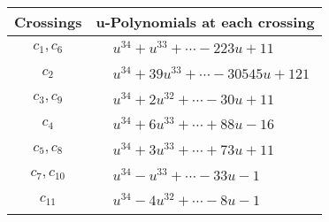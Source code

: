 \documentclass[1p]{elsarticle_modified}
\theoremstyle{definition}
\begin{document}
\begin{tabular}{m{50pt}|m{274pt}}
Crossings & \hspace{64pt}u-Polynomials at each crossing \\
\hline $$\begin{aligned}c_{1},c_{6}\end{aligned}$$&$\begin{aligned}
&u^{34}+u^{33}+\cdots-223 u+11
\end{aligned}$\\
\hline $$\begin{aligned}c_{2}\end{aligned}$$&$\begin{aligned}
&u^{34}+39 u^{33}+\cdots-30545 u+121
\end{aligned}$\\
\hline $$\begin{aligned}c_{3},c_{9}\end{aligned}$$&$\begin{aligned}
&u^{34}+2 u^{32}+\cdots-30 u+11
\end{aligned}$\\
\hline $$\begin{aligned}c_{4}\end{aligned}$$&$\begin{aligned}
&u^{34}+6 u^{33}+\cdots+88 u-16
\end{aligned}$\\
\hline $$\begin{aligned}c_{5},c_{8}\end{aligned}$$&$\begin{aligned}
&u^{34}+3 u^{33}+\cdots+73 u+11
\end{aligned}$\\
\hline $$\begin{aligned}c_{7},c_{10}\end{aligned}$$&$\begin{aligned}
&u^{34}- u^{33}+\cdots-33 u-1
\end{aligned}$\\
\hline $$\begin{aligned}c_{11}\end{aligned}$$&$\begin{aligned}
&u^{34}-4 u^{32}+\cdots-8 u-1
\end{aligned}$\\
\hline
\end{tabular}\\~\\
\newpage\renewcommand{\arraystretch}{1}
\end{document}
